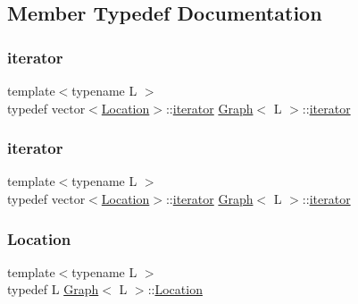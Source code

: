 \subsection{Member Typedef Documentation}
\mbox{\label{structGraph_af43d6412d7a6034eaeacde8ca1c1d984}} 
\subsubsection{\texorpdfstring{iterator}{iterator}\hspace{0.1cm}{\footnotesize\ttfamily [1/2]}}
{\footnotesize\ttfamily template$<$typename L $>$ \\
typedef vector$<$\mbox{\hyperlink{structGraph_aea7d42bb67163fe692353674435a1426}{Location}}$>$\+::\mbox{\hyperlink{structGraph_af43d6412d7a6034eaeacde8ca1c1d984}{iterator}} \mbox{\hyperlink{structGraph}{Graph}}$<$ L $>$\+::\mbox{\hyperlink{structGraph_af43d6412d7a6034eaeacde8ca1c1d984}{iterator}}}

\mbox{\label{structGraph_af43d6412d7a6034eaeacde8ca1c1d984}} 
\subsubsection{\texorpdfstring{iterator}{iterator}\hspace{0.1cm}{\footnotesize\ttfamily [2/2]}}
{\footnotesize\ttfamily template$<$typename L $>$ \\
typedef vector$<$\mbox{\hyperlink{structGraph_aea7d42bb67163fe692353674435a1426}{Location}}$>$\+::\mbox{\hyperlink{structGraph_af43d6412d7a6034eaeacde8ca1c1d984}{iterator}} \mbox{\hyperlink{structGraph}{Graph}}$<$ L $>$\+::\mbox{\hyperlink{structGraph_af43d6412d7a6034eaeacde8ca1c1d984}{iterator}}}

\mbox{\label{structGraph_aea7d42bb67163fe692353674435a1426}} 
\subsubsection{\texorpdfstring{Location}{Location}\hspace{0.1cm}{\footnotesize\ttfamily [1/2]}}
{\footnotesize\ttfamily template$<$typename L $>$ \\
typedef L \mbox{\hyperlink{structGraph}{Graph}}$<$ L $>$\+::\mbox{\hyperlink{structGraph_aea7d42bb67163fe692353674435a1426}{Location}}}

